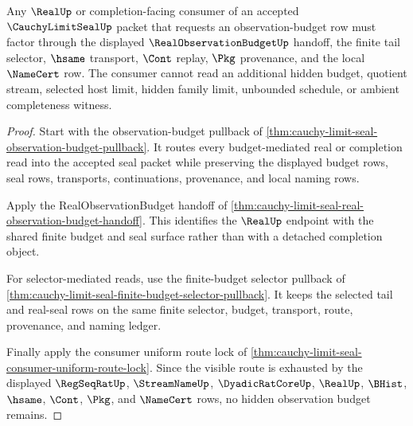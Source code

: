\begin{theorem}
\label{thm:cauchy-limit-seal-consumer-observation-budget-readback}
Any $\RealUp$ or completion-facing consumer of an accepted $\CauchyLimitSealUp$ packet that requests an observation-budget row must factor through the displayed $\RealObservationBudgetUp$ handoff, the finite tail selector, $\hsame$ transport, $\Cont$ replay, $\Pkg$ provenance, and the local $\NameCert$ row. The consumer cannot read an additional hidden budget, quotient stream, selected host limit, hidden family limit, unbounded schedule, or ambient completeness witness.
\end{theorem}
\begin{proof}
Start with the observation-budget pullback of \autoref{thm:cauchy-limit-seal-observation-budget-pullback}. It routes every budget-mediated real or completion read into the accepted seal packet while preserving the displayed budget rows, seal rows, transports, continuations, provenance, and local naming rows.

Apply the RealObservationBudget handoff of \autoref{thm:cauchy-limit-seal-real-observation-budget-handoff}. This identifies the $\RealUp$ endpoint with the shared finite budget and seal surface rather than with a detached completion object.

For selector-mediated reads, use the finite-budget selector pullback of \autoref{thm:cauchy-limit-seal-finite-budget-selector-pullback}. It keeps the selected tail and real-seal rows on the same finite selector, budget, transport, route, provenance, and naming ledger.

Finally apply the consumer uniform route lock of \autoref{thm:cauchy-limit-seal-consumer-uniform-route-lock}. Since the visible route is exhausted by the displayed $\RegSeqRatUp$, $\StreamNameUp$, $\DyadicRatCoreUp$, $\RealUp$, $\BHist$, $\hsame$, $\Cont$, $\Pkg$, and $\NameCert$ rows, no hidden observation budget remains.
\end{proof}

